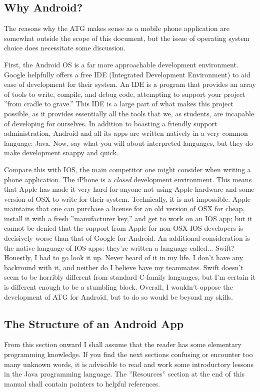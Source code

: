 \subsection{Why Android?}
The reasons why the ATG makes sense as a mobile phone application are somewhat outside the scope of this document, but the issue of
operating system choice does necessitate some discussion.\par
First, the Android OS is a far more approachable development environment. Google helpfully offers a free IDE (Integrated Development Environment) to aid ease of development for their system. An IDE is a program that provides an array of tools to write, compile, and debug code, 
attempting to support your project ''from cradle to grave.'' This IDE is a large part of what makes this project possible, as it provides
essentially all the tools that we, as students, are incapable of developing for ourselves. In addition to boasting a friendly support
administration, Android and all its apps are written natively in a very common language: Java. Now, say what you will about interpreted
languages, but they do make development snappy and quick.\par
Compare this with IOS, the main competitor one might consider when writing a phone application. The iPhone is a \emph{closed} development
environment. This means that Apple has made it very hard for anyone not using Apple hardware and some version of OSX to write for their system.
Technically, it is not impossible. Apple maintains that one can purchase a license for an old version of OSX for cheap, install it with a
fresh ''manufacturer key,'' and get to work on an IOS app; but it cannot be denied that the support from Apple for non-OSX IOS developers
is decisively worse than that of Google for Android. An additional consideration is the native language of IOS apps: they're written
a language called... Swift? Honestly, I had to go look it up. Never heard of it in my life. I don't have any backround with it, and neither
do I believe have my teammates. Swift doesn't seem to be horribly different from standard C-family languages, but I'm certain it is different
enough to be a stumbling block. Overall, I wouldn't oppose the development of ATG for Android, but to do so would be beyond my skills.

\subsection{The Structure of an Android App}
From this section onward I shall assume that the reader has some elementary programming knowledge. If you find the next sections confusing
or encounter too many unknown words, it is advisable to read and work some introductory lessons in the Java programming language.
The ''Resources'' section at the end of this manual shall contain pointers to helpful references.\cite{javaOracle}

